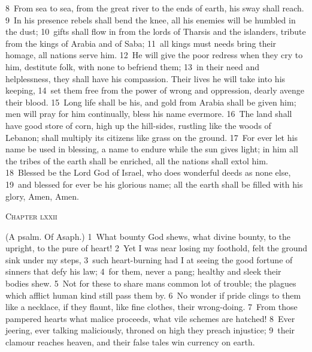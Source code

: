 \documentclass[10pt]{book} %
\begin{document}
\textcolor{benred8}{8}~From sea to sea, from the great river to the ends of earth, his sway shall reach. \textcolor{benred8}{9}~In his presence rebels shall bend the knee, all his enemies will be humbled in the dust; \textcolor{benred8}{10}~gifts shall flow in from the lords of Tharsis and the islanders, tribute from the kings of Arabia and of Saba; \textcolor{benred8}{11}~all kings must needs bring their homage, all nations serve him. \textcolor{benred8}{12}~He will give the poor redress when they cry to him, destitute folk, with none to befriend them; \textcolor{benred8}{13}~in their need and helplessness, they shall have his compassion. Their lives he will take into his keeping, \textcolor{benred8}{14}~set them free from the power of wrong and oppression, dearly avenge their blood. \textcolor{benred8}{15}~Long life shall be his, and gold from Arabia shall be given him; men will pray for him continually, bless his name evermore. \textcolor{benred8}{16}~The land shall have good store of corn, high up the hill-sides, rustling like the woods of Lebanon; shall multiply its citizens like grass on the ground. \textcolor{benred8}{17}~For ever let his name be used in blessing, a name to endure while the sun gives light; in him all the tribes of the earth shall be enriched, all the nations shall extol him.
\textcolor{benred8}{18}~Blessed be the Lord God of Israel, who does wonderful deeds as none else, \textcolor{benred8}{19}~and blessed for ever be his glorious name; all the earth shall be filled with his glory, Amen, Amen.
\begin{large}\begin{center}\textsc{Chapter lxxii}\end{center}\end{large}
(A psalm. Of Asaph.)
\textcolor{benred8}{1}~What bounty God shews, what divine bounty, to the upright, to the pure of heart! \textcolor{benred8}{2}~Yet I was near losing my foothold, felt the ground sink under my steps, \textcolor{benred8}{3}~such heart-burning had I at seeing the good fortune of sinners that defy his law; \textcolor{benred8}{4}~for them, never a pang; healthy and sleek their bodies shew. \textcolor{benred8}{5}~Not for these to share man\textquotesingle s common lot of trouble; the plagues which afflict human kind still pass them by. \textcolor{benred8}{6}~No wonder if pride clings to them like a necklace, if they flaunt, like fine clothes, their wrong-doing. \textcolor{benred8}{7}~From those pampered hearts what malice proceeds, what vile schemes are hatched! \textcolor{benred8}{8}~Ever jeering, ever talking maliciously, throned on high they preach injustice; \textcolor{benred8}{9}~their clamour reaches heaven, and their false tales win currency on earth.
\end{document}
